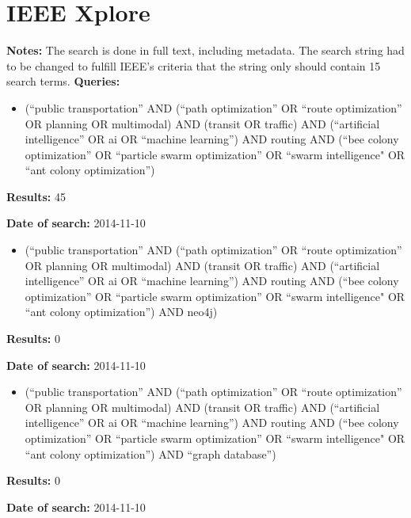 \section{IEEE Xplore}
\par \textbf{Notes:} The search is done in full text, including metadata. The search string had to be changed to fulfill IEEE's criteria that the string only should contain 15 search terms. 
\newline
\newline 
\textbf{Queries:}
\begin{itemize}
	\item(``public transportation'' AND (``path optimization'' OR ``route optimization'' OR planning OR multimodal) AND (transit OR traffic) AND (``artificial intelligence'' OR ai OR ``machine learning'') AND routing AND (``bee colony optimization'' OR ``particle swarm optimization'' OR ``swarm intelligence" OR ``ant colony optimization'')
\end{itemize}
\par \textbf{Results:} 45
\par \textbf{Date of search:} 2014-11-10 
\begin{itemize}
	\item(``public transportation'' AND (``path optimization'' OR ``route optimization'' OR planning OR multimodal) AND (transit OR traffic) AND (``artificial intelligence'' OR ai OR ``machine learning'') AND routing AND (``bee colony optimization'' OR ``particle swarm optimization'' OR ``swarm intelligence" OR ``ant colony optimization'') AND neo4j)
\end{itemize}
\par \textbf{Results:} 0
\par \textbf{Date of search:} 2014-11-10 
\begin{itemize}
		\item(``public transportation'' AND (``path optimization'' OR ``route optimization'' OR planning OR multimodal) AND (transit OR traffic) AND (``artificial intelligence'' OR ai OR ``machine learning'') AND routing AND (``bee colony optimization'' OR ``particle swarm optimization'' OR ``swarm intelligence" OR ``ant colony optimization'') AND ``graph database'')
\end{itemize}
\par \textbf{Results:} 0
\par \textbf{Date of search:} 2014-11-10 


